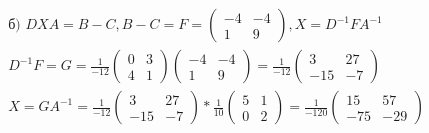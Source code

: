\documentclass{report}
\begin{document}
\begin{equation}
\begin{split}
	& \mbox{б) }DXA=B-C, B-C=F=\begin{pmatrix}-4 & -4\\1 & 9\end{pmatrix}, X = D^{-1}FA^{-1} \\
& D^{-1}F = G = \frac{1}{-12}\begin{pmatrix}0 & 3\\4 & 1\end{pmatrix}\begin{pmatrix}-4 & -4\\1 & 9\end{pmatrix} = \frac{1}{-12}\begin{pmatrix}3 & 27\\-15 & -7\end{pmatrix} \\
& X = GA^{-1} = \frac{1}{-12}\begin{pmatrix}3 & 27\\-15 & -7\end{pmatrix} * \frac{1}{10}\begin{pmatrix}5 & 1\\0 & 2\end{pmatrix} = \frac{1}{-120}\begin{pmatrix}15 & 57\\-75 & -29\end{pmatrix}
\end{split}\end{equation}
\end{document}
